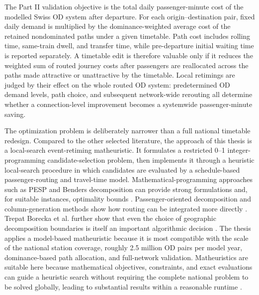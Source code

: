 \documentclass[10pt,a4paper]{article}
\begin{document}
The Part II validation objective is the total daily passenger-minute cost of the modelled Swiss OD system after departure. For each origin–destination pair, fixed daily demand is multiplied by the dominance-weighted average cost of the retained nondominated paths under a given timetable. Path cost includes rolling time, same-train dwell, and transfer time, while pre-departure initial waiting time is reported separately. A timetable edit is therefore valuable only if it reduces the weighted sum of routed journey costs after passengers are reallocated across the paths made attractive or unattractive by the timetable. Local retimings are judged by their effect on the whole routed OD system: predetermined OD demand levels, path choice, and subsequent network-wide rerouting all determine whether a connection-level improvement becomes a systemwide passenger-minute saving.

The optimization problem is deliberately narrower than a full national timetable redesign. Compared to the other selected literature, the approach of this thesis is a local-search event-retiming matheuristic. It formulates a restricted 0--1 integer-programming candidate-selection problem, then implements it through a heuristic local-search procedure in which candidates are evaluated by a schedule-based passenger-routing and travel-time model. Mathematical-programming approaches such as PESP and Benders decomposition can provide strong formulations and, for suitable instances, optimality bounds \citep{serafini1989periodic,liebchen2007pesp,leutwilerCorman2022LogicBenders}. Passenger-oriented decomposition and column-generation methods show how routing can be integrated more directly \citep{schiewe2020integrated,martinIradiRopke2022Matheuristic,yaoEtAl2025HybridBenders}. Trepat Borecka et al. further show that even the choice of geographic decomposition boundaries is itself an important algorithmic decision \citep{trepatBoreckaEtAl2025Geographic}. The thesis applies a model-based matheuristic because it is most compatible with the scale of the national station coverage, roughly 2.5 million OD pairs per model year, dominance-based path allocation, and full-network validation. Matheuristics are suitable here because mathematical objectives, constraints, and exact evaluations can guide a heuristic search without requiring the complete national problem to be solved globally, leading to substantial results within a reasonable runtime \citep{boschettiManiezzo2022Matheuristics}.
\end{document}

